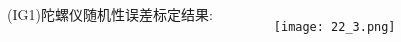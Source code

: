 \begin{frame}
\begin{columns}
  
  (IG1)陀螺仪随机性误差标定结果:
	\begin{figure}[h]
		\texttt{[image: 22\_3.png]}
  \end{figure}
  

\end{columns}
\end{frame} 


